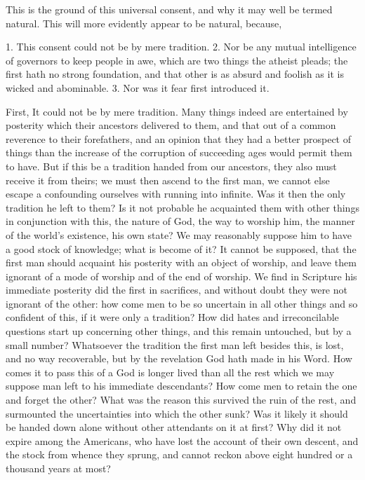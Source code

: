 \documentclass[a5paper]{book}
\begin{document}
This is the ground of this universal consent, 
    and why it may well be termed natural. 
This will more evidently appear to be natural, because,

1. This consent could not be by mere tradition. 
2. Nor be any mutual intelligence of governors to keep people in awe, 
    which are two things the atheist pleads; 
    the first hath no strong foundation,
    and that other is as absurd and foolish 
    as it is wicked and abominable. 
3. Nor was it fear first introduced it.

First, It could not be by mere tradition. Many things indeed are
entertained by posterity which their ancestors delivered to them, and
that out of a common reverence to their forefathers, and an opinion
that they had a better prospect of things than the increase of the
corruption of succeeding ages would permit them to have. But if
this be a tradition handed from our ancestors, they also must receive
it from theirs; we must then ascend to the first man, we cannot
else escape a confounding ourselves with running into infinite. Was
it then the only tradition he left to them? Is it not probable he
acquainted them with other things in conjunction with this, the
nature of God, the way to worship him, the manner of the world’s
existence, his own state? We may reasonably suppose him to have
a good stock of knowledge; what is become of it? It cannot be
supposed, that the first man should acquaint his posterity with an
object of worship, and leave them ignorant of a mode of worship
and of the end of worship. We find in Scripture his immediate
posterity did the first in sacrifices, and without doubt they were not
ignorant of the other: how come men to be so uncertain in all other
things and so confident of this, if it were only a tradition? How
did hates and irreconcilable questions start up concerning other
things, and this remain untouched, but by a small number? 
Whatsoever the tradition the first man left besides this, is lost, and no way
recoverable, but by the revelation God hath made in his Word.
How comes it to pass this of a God is longer lived than all the rest
which we may suppose man left to his immediate descendants? How
come men to retain the one and forget the other? What was the
reason this survived the ruin of the rest, and surmounted the 
uncertainties into which the other sunk? Was it likely it should be
handed down alone without other attendants on it at first? Why
did it not expire among the Americans, who have lost the account
of their own descent, and the stock from whence they sprung, and
cannot reckon above eight hundred or a thousand years at most?
\end{document}
